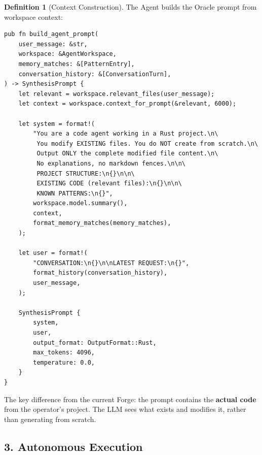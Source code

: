 \documentclass[11pt,a4paper,twoside]{article}
\theoremstyle{definition}
\newtheorem{definition}{Definition}[section]
\theoremstyle{remark}
\begin{document}
\begin{definition}[Context Construction]\label{def:context}
The Agent builds the Oracle prompt from workspace context:
\begin{lstlisting}
pub fn build_agent_prompt(
    user_message: &str,
    workspace: &AgentWorkspace,
    memory_matches: &[PatternEntry],
    conversation_history: &[ConversationTurn],
) -> SynthesisPrompt {
    let relevant = workspace.relevant_files(user_message);
    let context = workspace.context_for_prompt(&relevant, 6000);

    let system = format!(
        "You are a code agent working in a Rust project.\n\
         You modify EXISTING files. You do NOT create from scratch.\n\
         Output ONLY the complete modified file content.\n\
         No explanations, no markdown fences.\n\n\
         PROJECT STRUCTURE:\n{}\n\n\
         EXISTING CODE (relevant files):\n{}\n\n\
         KNOWN PATTERNS:\n{}",
        workspace.model.summary(),
        context,
        format_memory_matches(memory_matches),
    );

    let user = format!(
        "CONVERSATION:\n{}\n\nLATEST REQUEST:\n{}",
        format_history(conversation_history),
        user_message,
    );

    SynthesisPrompt {
        system,
        user,
        output_format: OutputFormat::Rust,
        max_tokens: 4096,
        temperature: 0.0,
    }
}
\end{lstlisting}

The key difference from the current Forge: the prompt contains the
\textbf{actual code} from the operator's project. The LLM sees what
exists and modifies it, rather than generating from scratch.
\end{definition}


\subsection{3. Autonomous Execution}\label{sec:execution}
\end{document}
